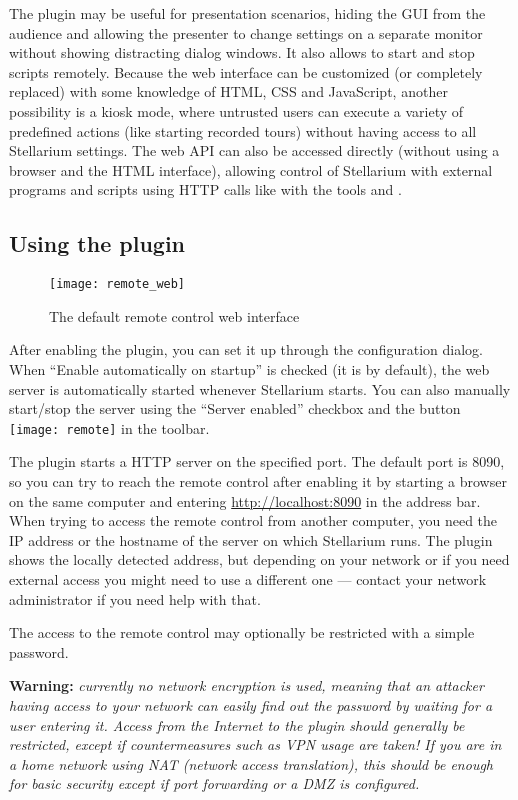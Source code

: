 The plugin may be useful for presentation scenarios, hiding the GUI from the 
audience and allowing the presenter to change settings on a separate monitor 
without showing distracting dialog windows. It also allows to start and stop 
scripts remotely. Because the web interface can be customized (or completely 
replaced) with some knowledge of HTML, CSS and JavaScript, another possibility 
is a kiosk mode, where untrusted users can execute a variety of predefined 
actions (like starting recorded tours) without having access to all Stellarium 
settings. The web API can also be accessed directly (without using a browser 
and the HTML interface), allowing control of Stellarium with external programs 
and scripts using HTTP calls like with the tools  and .

\subsection{Using the plugin}
\label{sec:plugins:RemoteControl:using}

\begin{figure}[h]
\centering\texttt{[image: remote\_web]}
\caption{The default remote control web interface}
\end{figure}

After enabling the plugin, you can set it up through the configuration dialog. 
When ``Enable automatically on startup'' is checked (it is by default), the web 
server is automatically started whenever Stellarium starts. You can also 
manually start/stop the server using the ``Server enabled'' checkbox and the 
button \texttt{[image: remote]} in the toolbar.

The plugin starts a HTTP server on the specified port. The default port is 
8090, so you can try to reach the remote control after enabling it by starting 
a browser on the same computer and entering \url{http://localhost:8090} in the 
address bar. When trying to access the remote control from another computer, 
you need the IP address or the hostname of the server on which Stellarium runs. 
The plugin shows the locally detected address, but depending on your network or 
if you need external access you might need to use a different one 
--- contact your network administrator if you need help with that.

The access to the remote control may optionally be restricted with a simple 
password.

\textbf{Warning:} \emph{currently no network encryption is used, meaning that 
an attacker having access to your network can easily find out the password by 
waiting for a user entering it. Access from the Internet to the 
plugin should generally be restricted, except if countermeasures such as VPN 
usage are taken! If you are in a home network using NAT (network access 
translation), this should be enough for basic security except if port 
forwarding or a DMZ is configured.}

